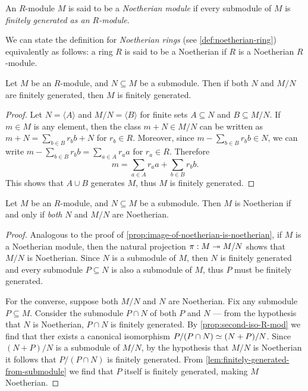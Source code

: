 \begin{definition}
\label{def:noetherian-module}
An \(R\)-module \(M\) is said to be a \emph{Noetherian module} if every
submodule of \(M\) is \emph{finitely generated as an \(R\)-module}.
\end{definition}

We can state the definition for \emph{Noetherian rings} (see
\cref{def:noetherian-ring}) equivalently as follows: a ring \(R\) is said to be
a Noetherian if \(R\) is a Noetherian \(R\)-module.

\begin{lemma}
\label{lem:finitely-generated-from-submodule}
Let \(M\) be an \(R\)-module, and \(N \subseteq M\) be a submodule. Then if both
\(N\) and \(M/N\) are finitely generated, then \(M\) is finitely generated.
\end{lemma}

\begin{proof}
Let \(N = \langle A \rangle\) and \(M/N = \langle B \rangle\) for finite sets
\(A \subseteq N\) and \(B \subseteq M/N\). If \(m \in M\) is any element, then
the class \(m + N \in M/N\) can be written as
\(m + N = \sum_{b \in B} r_b b + N\) for \(r_b \in R\). Moreover, since
\(m - \sum_{b \in B} r_b b \in N\), we can write
\(m - \sum_{b \in B} r_b b = \sum_{a \in A} r_a a\) for \(r_a \in R\). Therefore
\[
m = \sum_{a \in A} r_a a + \sum_{b \in B} r_b b.
\]
This shows that \(A \cup B\) generates \(M\), thus \(M\) is finitely generated.
\end{proof}

\begin{proposition}
\label{prop:noetherian-from-submodule}
Let \(M\) be an \(R\)-module, and \(N \subseteq M\) be a submodule. Then \(M\)
is Noetherian if and only if \emph{both} \(N\) and \(M/N\) are Noetherian.
\end{proposition}

\begin{proof}
Analogous to the proof of \cref{prop:image-of-noetherian-is-noetherian}, if
\(M\) is a Noetherian module, then the natural projection \(\pi: M \twoheadrightarrow M/N\)
shows that \(M/N\) is Noetherian. Since \(N\) is a submodule of \(M\), then
\(N\) is finitely generated and every submodule \(P \subseteq N\) is also a
submodule of \(M\), thus \(P\) must be finitely generated.

For the converse, suppose both \(M/N\) and \(N\) are Noetherian. Fix any
submodule \(P \subseteq M\). Consider the submodule \(P \cap N\) of both \(P\)
and \(N\) --- from the hypothesis that \(N\) is Noetherian, \(P \cap N\) is
finitely generated. By \cref{prop:second-iso-R-mod} we find that ther exists a
canonical isomorphism \(P/(P \cap N) \simeq (N + P)/N\). Since
\((N + P)/N\) is a submodule of \(M/N\), by the hypothesis that \(M/N\) is
Noetherian it follows that \(P/(P \cap N)\) is finitely generated. From
\cref{lem:finitely-generated-from-submodule} we find that \(P\) itself is
finitely generated, making \(M\) Noetherian.
\end{proof}

